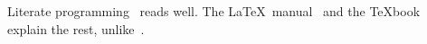 \documentclass{article}
\begin{document}
Literate programming~\cite{knuth84} reads well. The \LaTeX\ manual~\cite{lamport94}
and the \TeX book~\cite{knuth86} explain the rest, unlike~\cite{missing}.



\end{document}
